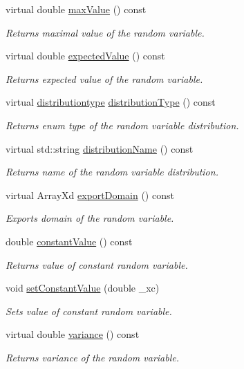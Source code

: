 \begin{DoxyCompactItemize}
virtual double \hyperlink{class_c_constant_c_r_v_a33cd27bc45a581fdcb4f780387e90373}{max\-Value} () const 
\begin{DoxyCompactList}\small\item\em Returns maximal value of the random variable. \end{DoxyCompactList}\item 
virtual double \hyperlink{class_c_constant_c_r_v_a54ca9f831246b31679becf095aa655e3}{expected\-Value} () const 
\begin{DoxyCompactList}\small\item\em Returns expected value of the random variable. \end{DoxyCompactList}\item 
virtual \hyperlink{class_c_random_variable_a80d2a87c43847274138b51f7d713d7f1}{distributiontype} \hyperlink{class_c_constant_c_r_v_ab23347fb640e75308cf6dade83e0f9ae}{distribution\-Type} () const 
\begin{DoxyCompactList}\small\item\em Returns enum type of the random variable distribution. \end{DoxyCompactList}\item 
virtual std\-::string \hyperlink{class_c_constant_c_r_v_adf14a402f883d652657f53ab4a10d0be}{distribution\-Name} () const 
\begin{DoxyCompactList}\small\item\em Returns name of the random variable distribution. \end{DoxyCompactList}\item 
virtual Array\-Xd \hyperlink{class_c_constant_c_r_v_a19ccacd82627d70423d98f3cd81fb7b8}{export\-Domain} () const 
\begin{DoxyCompactList}\small\item\em Exports domain of the random variable. \end{DoxyCompactList}\item 
double \hyperlink{class_c_constant_c_r_v_a78b8c987ec4325a3e57c2c25effb851f}{constant\-Value} () const 
\begin{DoxyCompactList}\small\item\em Returns value of constant random variable. \end{DoxyCompactList}\item 
void \hyperlink{class_c_constant_c_r_v_a358c670636bdfdec515f279abd2db23a}{set\-Constant\-Value} (double \-\_\-xc)
\begin{DoxyCompactList}\small\item\em Sets value of constant random variable. \end{DoxyCompactList}\item 
virtual double \hyperlink{class_c_constant_c_r_v_a606fa01ade61968377b77fec8e22bb5b}{variance} () const 
\begin{DoxyCompactList}\small\item\em Returns variance of the random variable. \end{DoxyCompactList}\end{DoxyCompactItemize}
